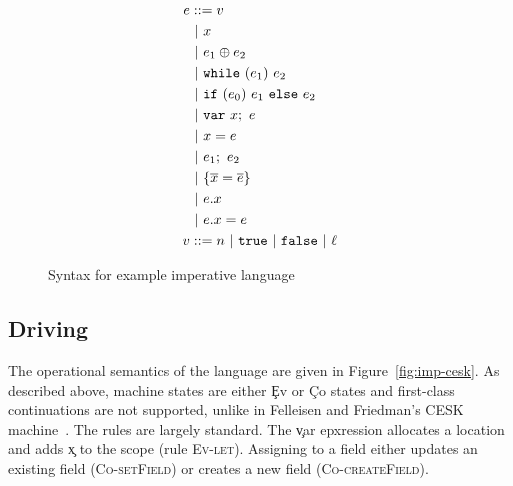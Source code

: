 \begin{figure}
\begin{align*}
    e &::= v \\
        & \bnf x \\
        & \bnf e_1 \oplus e_2 \\
        & \bnf \c{while}~(e_1)~e_2 \\
        & \bnf \c{if}~(e_0)~e_1~\c{else}~e_2 \\
        & \bnf \c{var}~x;~e \\
        & \bnf x = e \\
        & \bnf e_1;~e_2 \\
        & \bnf \{ \overline{x} = \overline{e} \} \\
        & \bnf e.x \\
        & \bnf e.x = e \\
    v &::= n \bnf \c{true} \bnf \c{false} \bnf \ell
\end{align*}
  \caption{Syntax for example imperative language}
  \label{fig:imp-syntax}
\end{figure}

\subsection{Driving}

The operational semantics of the language are given in Figure~\ref{fig:imp-cesk}.
As described above, machine states are either \c{Ev} or \c{Co} states
and first-class continuations are not supported, unlike in 
Felleisen and Friedman's CESK machine~\cite{cesk}.
The rules are largely standard.
The \c{var} epxression allocates a location and
adds \c{x} to the scope (rule \textsc{Ev-let}).
Assigning to a field 
either updates 
an existing field (\textsc{Co-setField})
or creates a new field (\textsc{Co-createField}).

\newcommand\then[2]{(\bullet;~#1, #2)}
\newcommand\branch[3]{(\c{if}~(\bullet)~#1~\c{else}~#2, #3)}
\newcommand\init[3]{(\bullet.#1 = #2, #3)}

\newcommand{\residual}[1]{\langle\!\langle{#1}\rangle\!\rangle}


